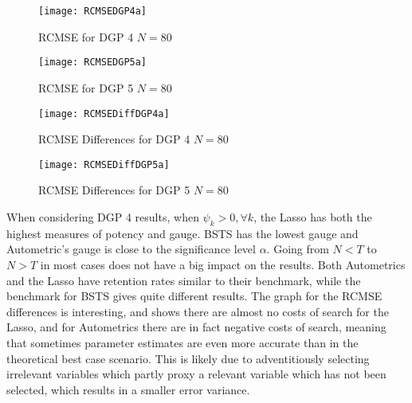 \begin{figure}

\begin{minipage}{.5\textwidth}
\centering
\texttt{[image: RCMSEDGP4a]}
\caption{RCMSE for DGP 4 \newline $N=80$}
\label{fig:CMSEDGP4a}
\end{minipage}%
\begin{minipage}{.5\textwidth}
\centering
\texttt{[image: RCMSEDGP5a]}
\caption{RCMSE for DGP 5 \newline $N=80$}
\label{fig:CMSEDGP5a}

\end{minipage}

\end{figure}

\begin{figure}

\begin{minipage}{.5\textwidth}
\centering
\texttt{[image: RCMSEDiffDGP4a]}
\captionsetup{justification=centering}
\caption{RCMSE Differences for DGP 4 \newline $N=80$}
\label{fig:CMSEDiffDGP4a}
\end{minipage}%
\begin{minipage}{.5\textwidth}
\centering
\texttt{[image: RCMSEDiffDGP5a]}
\captionsetup{justification=centering}
\caption{RCMSE Differences for DGP 5 \newline $N=80$}
\label{fig:CMSEDiffDGP5a}

\end{minipage}

\end{figure}

\clearpage

When considering DGP 4 results, when $\psi_{k} > 0, \forall k$, the Lasso has both the highest measures of potency and gauge. BSTS has the lowest gauge and Autometric's gauge is close to the significance level $\alpha$. Going from $N<T$ to $N>T$ in most cases does not have a big impact on the results. Both Autometrics and the Lasso have retention rates similar to their benchmark, while the benchmark for BSTS gives quite different results. The graph for the RCMSE differences is interesting, and shows there are almost no costs of search for the Lasso, and for Autometrics there are in fact negative costs of search, meaning that sometimes parameter estimates are even more accurate than in the theoretical best case scenario. This is likely due to adventitiously selecting irrelevant variables which partly proxy a relevant variable which has not been selected, which results in a smaller error variance.

